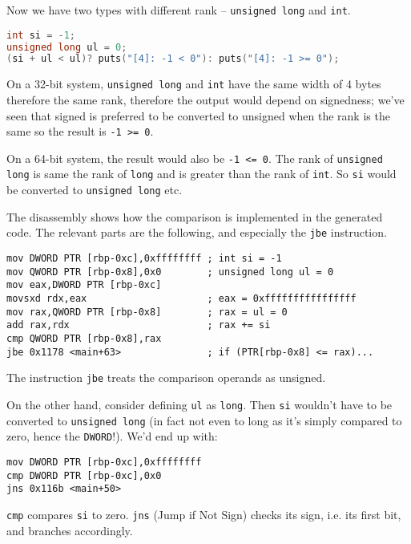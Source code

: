 \begin{exmp}
Now we have two types with different rank -- \texttt{unsigned long} and \texttt{int}. 
\begin{lstlisting}[language=c]
int si = -1;
unsigned long ul = 0;
(si + ul < ul)? puts("[4]: -1 < 0"): puts("[4]: -1 >= 0");
\end{lstlisting}
On a 32-bit system, \texttt{unsigned long} and \texttt{int} have the same width of 4 bytes therefore the same rank, therefore the output would depend on signedness; we've seen that signed is preferred to be converted to unsigned when the rank is the same so the result is \texttt{-1 >= 0}.

On a 64-bit system, the result would also be \texttt{-1 <= 0}. The rank of \texttt{unsigned long} is same the rank of \texttt{long} and is greater than the rank of \texttt{int}. So \texttt{si} would be converted to \texttt{unsigned long} etc.

The disassembly shows how the comparison is implemented in the generated code. The relevant parts are the following, and especially the \texttt{jbe} instruction.
\begin{lstlisting}
mov DWORD PTR [rbp-0xc],0xffffffff ; int si = -1
mov QWORD PTR [rbp-0x8],0x0        ; unsigned long ul = 0
mov eax,DWORD PTR [rbp-0xc]
movsxd rdx,eax                     ; eax = 0xffffffffffffffff
mov rax,QWORD PTR [rbp-0x8]        ; rax = ul = 0
add rax,rdx                        ; rax += si
cmp QWORD PTR [rbp-0x8],rax
jbe 0x1178 <main+63>               ; if (PTR[rbp-0x8] <= rax)...
\end{lstlisting}
\end{exmp}
The instruction \texttt{jbe} treats the comparison operands as unsigned.

On the other hand, consider defining \texttt{ul} as \texttt{long}. Then \texttt{si} wouldn't have to be converted to \texttt{unsigned long} (in fact not even to long as it's simply compared to zero, hence the \texttt{DWORD}!). We'd end up with:
\begin{lstlisting}
mov DWORD PTR [rbp-0xc],0xffffffff
cmp DWORD PTR [rbp-0xc],0x0
jns 0x116b <main+50>
\end{lstlisting}
\texttt{cmp} compares \texttt{si} to zero. \texttt{jns} (Jump if Not Sign) checks its sign, i.e. its first bit, and branches accordingly. \qedblack

